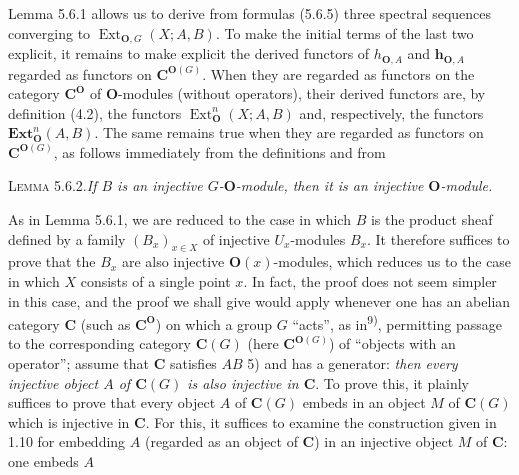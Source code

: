 Lemma 5.6.1 allows us to derive from formulas (5.6.5) three spectral sequences
converging to $\operatorname{Ext}_{{\mathbf O},G}(X;A,B)$. To make the initial terms
of the last two explicit, it remains to make explicit the derived functors of
$h_{{\mathbf O},A}$ and $\mathbf h_{{\mathbf O},A}$ regarded as functors on ${\mathbf C}^{{\mathbf O}(G)}$.
When they are regarded as functors on the category ${\mathbf C}^{\mathbf O}$ of ${\mathbf O}$-modules
(without operators), their derived functors are, by definition (4.2), the
functors $\operatorname{Ext}_{\mathbf O}^n(X;A,B)$ and, respectively, the functors
$\mathbf{Ext}_{\mathbf O}^n(A,B)$. The same remains true when they are regarded as
functors on ${\mathbf C}^{{\mathbf O}(G)}$, as follows immediately from the definitions and from

\textsc{Lemma 5.6.2.}\quad \textit{If $B$ is an injective
$G$-${\mathbf O}$-module, then it is an injective ${\mathbf O}$-module.}

As in Lemma 5.6.1, we are reduced to the case in which $B$ is the product
sheaf defined by a family $(B_x)_{x\in X}$ of injective $U_x$-modules $B_x$.
It therefore suffices to prove that the $B_x$ are also injective
${\mathbf O}(x)$-modules, which reduces us to the case in which $X$ consists of a single
point $x$.
In fact, the proof does not seem simpler in this case, and the proof we shall
give would apply whenever one has an abelian category ${\mathbf C}$ (such as ${\mathbf C}^{\mathbf O}$) on
which a group $G$ ``acts'', as in\textsuperscript{9)}, permitting passage to
the corresponding category ${\mathbf C}(G)$ (here ${\mathbf C}^{{\mathbf O}(G)}$) of ``objects with an
operator''; assume that ${\mathbf C}$ satisfies $AB$ 5) and has a generator: \textit{then
every injective object $A$ of ${\mathbf C}(G)$ is also injective in ${\mathbf C}$}.
To prove this, it plainly suffices to prove that every object $A$ of ${\mathbf C}(G)$
embeds in an object $M$ of ${\mathbf C}(G)$ which is injective in ${\mathbf C}$. For this, it
suffices to examine the construction given in 1.10 for embedding $A$
(regarded as an object of ${\mathbf C}$) in an injective object $M$ of ${\mathbf C}$: one embeds
$A$

